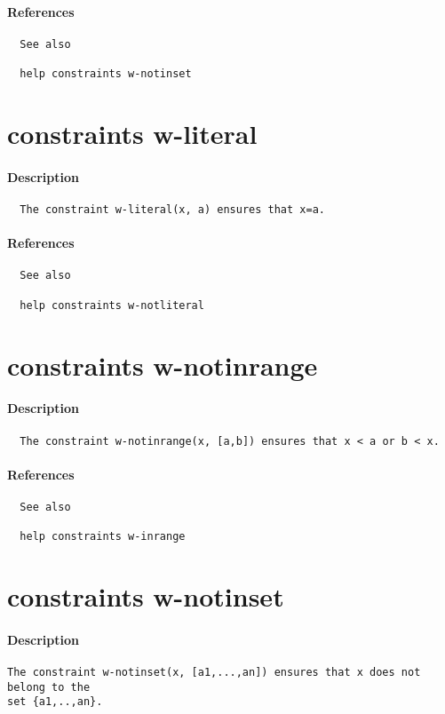 \paragraph{References}
{\footnotesize
\begin{verbatim}
  See also

  help constraints w-notinset
\end{verbatim}
}
\section{constraints w-literal}
\paragraph{Description}
{\footnotesize
\begin{verbatim}
  The constraint w-literal(x, a) ensures that x=a.
\end{verbatim}
}
\paragraph{References}
{\footnotesize
\begin{verbatim}
  See also

  help constraints w-notliteral
\end{verbatim}
}
\section{constraints w-notinrange}
\paragraph{Description}
{\footnotesize
\begin{verbatim}
  The constraint w-notinrange(x, [a,b]) ensures that x < a or b < x.
\end{verbatim}
}
\paragraph{References}
{\footnotesize
\begin{verbatim}
  See also

  help constraints w-inrange
\end{verbatim}
}
\section{constraints w-notinset}
\paragraph{Description}
{\footnotesize
\begin{verbatim}
The constraint w-notinset(x, [a1,...,an]) ensures that x does not belong to the
set {a1,..,an}.
\end{verbatim}
}
